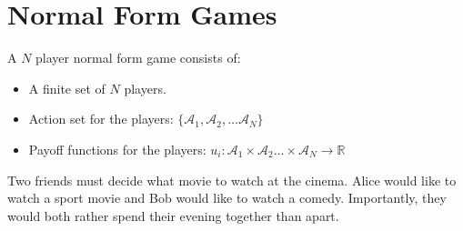 \documentclass{beamer}              %
\begin{document}
\section{Normal Form Games}

\begin{frame}

    \begin{definition}
        A $N$ player normal form game consists of:

        \begin{itemize}
            \item A finite set of $N$ players.
            \item Action set for the players: $\{\mathcal{A}_1, \mathcal{A}_2, \dots \mathcal{A}_N\}$
            \item Payoff functions for the players: $u_i : \mathcal{A}_1 \times \mathcal{A}_2 \dots \times \mathcal{A}_N \to \mathbb{R}$
        \end{itemize}
    \end{definition}
\end{frame}

\begin{frame}
    \begin{example}
        Two friends must decide what movie to watch at the cinema. Alice would like
        to watch a sport movie and Bob would like to watch a comedy. Importantly,
        they would both rather spend their evening together than apart.
    \end{example}
\end{frame}

\end{document}
